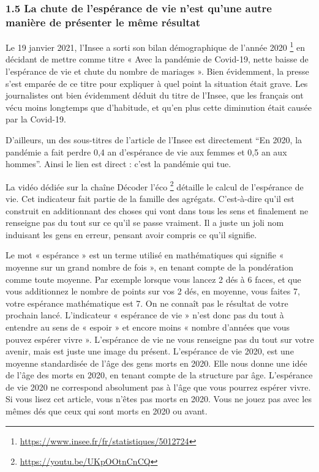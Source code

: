 \documentclass[
]{article}
\begin{document}
\hypertarget{la-chute-de-lespuxe9rance-de-vie-nest-quune-autre-maniuxe8re-de-pruxe9senter-le-muxeame-ruxe9sultat}{%
\subsubsection{1.5 La chute de l'espérance de vie n'est qu'une autre
manière de présenter le même
résultat}\label{la-chute-de-lespuxe9rance-de-vie-nest-quune-autre-maniuxe8re-de-pruxe9senter-le-muxeame-ruxe9sultat}}

Le 19 janvier 2021, l'Insee a sorti son bilan démographique de l'année
2020 \footnote{\url{https://www.insee.fr/fr/statistiques/5012724}} en
décidant de mettre comme titre « Avec la pandémie de Covid-19, nette
baisse de l'espérance de vie et chute du nombre de mariages ». Bien
évidemment, la presse s'est emparée de ce titre pour expliquer à quel
point la situation était grave. Les journalistes ont bien évidemment
déduit du titre de l'Insee, que les français ont vécu moins longtemps
que d'habitude, et qu'en plus cette diminution était causée par la
Covid-19.

D'ailleurs, un des sous-titres de l'article de l'Insee est directement
``En 2020, la pandémie a fait perdre 0,4 an d'espérance de vie aux
femmes et 0,5 an aux hommes''. Ainsi le lien est direct : c'est la
pandémie qui tue.

La vidéo dédiée sur la chaîne Décoder l'éco \footnote{\url{https://youtu.be/UKpOOtnCnCQ}}
détaille le calcul de l'espérance de vie. Cet indicateur fait partie de
la famille des agrégats. C'est-à-dire qu'il est construit en
additionnant des choses qui vont dans tous les sens et finalement ne
renseigne pas du tout sur ce qu'il se passe vraiment. Il a juste un joli
nom induisant les gens en erreur, pensant avoir compris ce qu'il
signifie.

Le mot « espérance » est un terme utilisé en mathématiques qui signifie
« moyenne sur un grand nombre de fois », en tenant compte de la
pondération comme toute moyenne. Par exemple lorsque vous lancez 2 dés à
6 faces, et que vous additionnez le nombre de points sur vos 2 dés, en
moyenne, vous faites 7, votre espérance mathématique est 7. On ne
connaît pas le résultat de votre prochain lancé. L'indicateur «
espérance de vie » n'est donc pas du tout à entendre au sens de « espoir
» et encore moins « nombre d'années que vous pouvez espérer vivre ».
L'espérance de vie ne vous renseigne pas du tout sur votre avenir, mais
est juste une image du présent. L'espérance de vie 2020, est une moyenne
standardisée de l'âge des gens morts en 2020. Elle nous donne une idée
de l'âge des morts en 2020, en tenant compte de la structure par âge.
L'espérance de vie 2020 ne correspond absolument pas à l'âge que vous
pourrez espérer vivre. Si vous lisez cet article, vous n'êtes pas morts
en 2020. Vous ne jouez pas avec les mêmes dés que ceux qui sont morts en
2020 ou avant.
\end{document}
